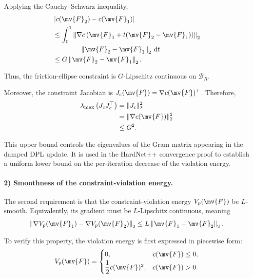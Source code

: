 Applying the Cauchy--Schwarz inequality,
\begin{equation}
	\begin{aligned}
		 &
		\left|
		c(\mv{F}_2)-c(\mv{F}_1)
		\right|
		\\
		 & \leq
		\int_0^1
		\left\|
		\nabla c
		\left(
		\mv{F}_1
		+
		t(\mv{F}_2-\mv{F}_1)
		\right)
		\right\|_2
		\\
		 & \qquad\qquad
		\left\|
		\mv{F}_2-\mv{F}_1
		\right\|_2
		\,\mathrm{d}t
		\\
		 & \leq
		G
		\left\|
		\mv{F}_2-\mv{F}_1
		\right\|_2
		.
	\end{aligned}
\end{equation}

Thus, the friction-ellipse constraint is $G$-Lipschitz continuous on
$\mathcal{B}_R$.

Moreover, the constraint Jacobian is $J_c(\mv{F})=\nabla c(\mv{F})^\top$.
Therefore,
\begin{equation}
	\begin{aligned}
		\lambda_{\max}
		\left(
		J_cJ_c^\top
		\right)
		 & =
		\|J_c\|_2^2
		\\
		 & =
		\|\nabla c(\mv{F})\|_2^2
		\\
		 & \leq
		G^2
		.
	\end{aligned}
\end{equation}

This upper bound controls the eigenvalues of the Gram matrix appearing in the
damped DPL update. It is used in the HardNet++ convergence proof to establish a
uniform lower bound on the per-iteration decrease of the violation energy.

\paragraph{2) Smoothness of the constraint-violation energy.}

The second requirement is that the constraint-violation energy $V_p(\mv{F})$ be
$L$-smooth. Equivalently, its gradient must be $L$-Lipschitz continuous,
meaning
\begin{equation}
	\left\|
	\nabla V_p(\mv{F}_1)
	-
	\nabla V_p(\mv{F}_2)
	\right\|_2
	\leq
	L
	\left\|
	\mv{F}_1-\mv{F}_2
	\right\|_2
	.
\end{equation}

To verify this property, the violation energy is first expressed in piecewise
form:
\begin{equation}
	V_p(\mv{F})
	=
	\begin{cases}
		0,
		 & c(\mv{F})\leq0
		,
		\\[2pt]
		\dfrac{1}{2}c(\mv{F})^2,
		 & c(\mv{F})>0
		.
	\end{cases}
\end{equation}

